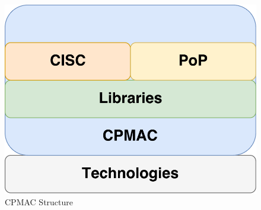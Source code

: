 \begin{figure}[h]
\includegraphics[scale=.5]{graphic/cpmac.pdf}
\centering
\caption{CPMAC Structure}
\end{figure}

